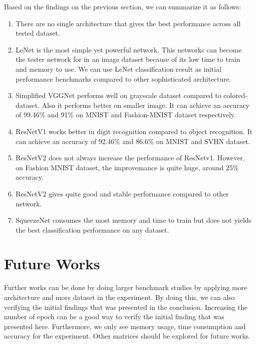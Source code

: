 Based on the findings on the previous section, we can summarize it as follows:
\begin{enumerate}
	\item There are no single architecture that gives the best performance across all tested dataset.
	\item LeNet is the most simple yet powerful network.
	This networks can become the tester network for in an image dataset because of its low time to train and memory to use. We can use LeNet classification result as initial performance benchmarks compared to other sophisticated architecture.
	\item Simplified VGGNet performs well on grayscale dataset compared to colored-dataset. Also it performs better on smaller image. It can achieve an accuracy of 99.46\% and 91\% on MNIST and Fashion-MNIST dataset respectively.
	\item ResNetV1 works better in digit recognition compared to object recognition. It can achieve an accuracy of 92.46\% and 86.6\% on MNIST and SVHN dataset.
	\item ResNetV2 does not always increase the performance of ResNetv1. However, on Fashion MNIST dataset, the improvemance is quite huge, around 25\% accuracy.
	\item ResNetV2 gives quite good and stable performance compared to other network.
	\item SqueezeNet consumes the most memory and time to train but does not yields the best classification performance on any dataset.
	
\end{enumerate}

\section{Future Works}
 Further works can be done by doing larger benchmark studies by applying more architecture and more dataset in the experiment. By doing this, we can also verifying the initial findings that was presented in the conclusion. Increasing the number of epoch can be a good way to verify the initial finding that was presented here. Furthermore, we only see memory usage, time consumption and accuracy for the experiment. Other matrices should be explored for future works.